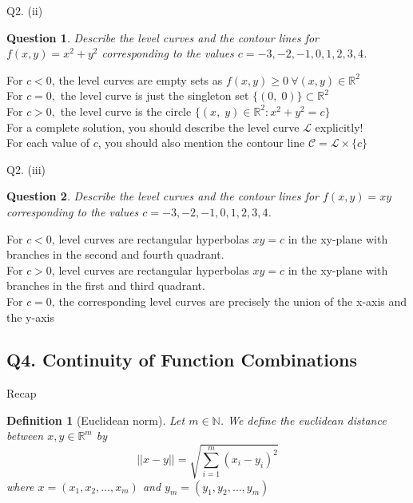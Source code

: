 \documentclass[handout,aspectratio=169]{beamer}
\newtheorem{df}{Definition}
\newtheorem{qsn}{Question}
\newcommand{\bN}{\mathbb{N}}
\newcommand{\bR}{\mathbb{R}}
\newcommand{\normtwo}[1]{||#1||}
\begin{document}
\begin{frame}{Q2. (ii)}
	\begin{qsn}
        Describe the level curves and the contour lines for $f(x,y) = x^2+y^2$ corresponding to the values $c=-3,-2,-1,0,1,2,3,4$.
	\end{qsn}
     {
    \vspace*{1mm}
	 For $ c < 0$, the level curves are empty sets as $f(x,y) \geq 0 ~\forall (x,y) \in \mathbb{R}^2$\\[1mm]
    }
	\uncover<3-> {
	For $c = 0,$ the level curve is just the singleton set $\{(0,\;0)\}\subset \mathbb{R}^2$\\[1mm]
	}
	\uncover<4-> {
    For $c > 0,$ the level curve is the circle $\{(x,\;y)\in\mathbb{R}^2:x^2 + y^2 = c\}$\\[2mm]
    }
     {
    For a complete solution, you should describe the level curve $\mathcal{L}$ explicitly!\\
    }
     {
    For each value of $c$, you should also mention the contour line $\mathcal{C} = \mathcal{L}\times \{c\}$
    }
\end{frame}

\begin{frame}{Q2. (iii)}
    \begin{qsn}
        Describe the level curves and the contour lines for $f(x,y) = xy$ corresponding to the values $c=-3,-2,-1,0,1,2,3,4$.
	\end{qsn}
	 {
	\vspace*{1mm}
	 For $c < 0$, level curves are rectangular hyperbolas $xy = c$ in the xy-plane with branches in the second and fourth quadrant. \\[1mm]
    }
	\uncover<3-> {
    For $c > 0$, level curves are rectangular hyperbolas $xy = c$ in the xy-plane with branches in the first and third quadrant. \\[1mm]
    }
	\uncover<4-> {
    For $c = 0$, the corresponding level curves are precisely the union of the x-axis and the y-axis
    }
\end{frame}

\subsection{Q4. Continuity of Function Combinations}

\begin{frame}{Recap}
 {
\begin{df}[Euclidean norm]
Let $m\in \bN$. We define the euclidean distance between $x,y \in \bR^m$ by
$$\normtwo{x-y} = \sqrt{\sum_{i=1}^m (x_i-y_i)^2}$$
where $x=(x_1,x_2,\dots,x_m)$ and $y_m = (y_1,y_2,\dots,y_m)$
\end{df}
}
\end{frame}
\end{document}
